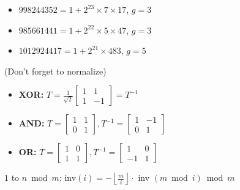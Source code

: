 \begin{itemize}
\itemsep -0.5em
\item $998244352 = 1 + 2^{23} \times 7 \times 17$, $g = 3$
\item $985661441 = 1 + 2^{22} \times 5 \times 47$, $g = 3$
\item $1012924417 = 1 + 2^{21} \times 483$, $g = 5$
\end{itemize}

 (Don't forget to normalize)
\begin{itemize}
  \itemsep -0.5em
  \item \textbf{XOR:} $T = \frac{1}{\sqrt{2}}\begin{bmatrix} 1 & 1 \\ 1 & -1 \end{bmatrix} = T^{-1}$
  \item \textbf{AND:} $T = \begin{bmatrix} 1 & 1 \\ 0 & 1 \end{bmatrix}, T^{-1} = \begin{bmatrix} 1 & -1 \\ 0 & 1 \end{bmatrix}$
  \item \textbf{OR:} $T = \begin{bmatrix} 1 & 0 \\ 1 & 1 \end{bmatrix}, T^{-1} = \begin{bmatrix} 1 & 0 \\ -1 & 1 \end{bmatrix}$
\end{itemize}

 $1$ to $n \bmod m$: inv$(i) = - \left\lfloor \frac{m}{i} \right\rfloor \cdot$ inv $(m \bmod i) \bmod m$

